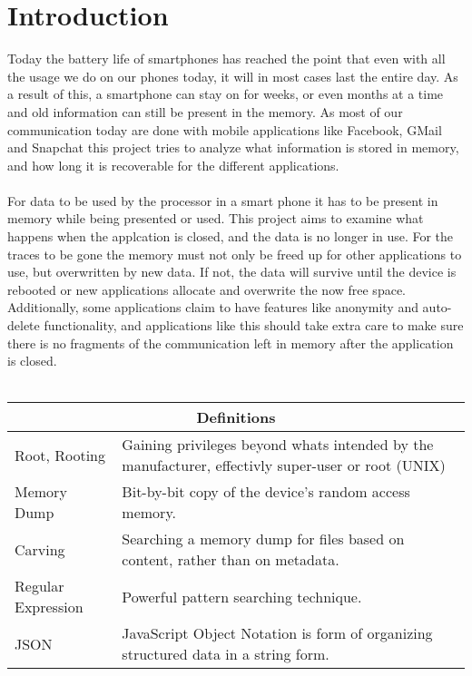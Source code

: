 \section{Introduction}
Today the battery life of smartphones has reached the point that even with all the usage we do on our phones today, it will in most cases last the entire day. As a result of this, a smartphone can stay on for weeks, or even months at a time and old information can still be present in the memory. As most of our communication today are done with mobile applications like Facebook, GMail and Snapchat this project tries to analyze what information is stored in memory, and how long it is recoverable for the different applications. \\ \\
For data to be used by the processor in a smart phone it has to be present in memory while being presented or used. This project aims to examine what happens when the applcation is closed, and the data is no longer in use. For the traces to be gone the memory must not only be freed up for other applications to use, but overwritten by new data. If not, the data will survive until the device is rebooted or new applications allocate and overwrite the now free space. Additionally, some applications claim to have features like anonymity and auto-delete functionality, and applications like this should take extra care to make sure there is no fragments of the communication left in memory after the application is closed.
\\ \\
\begin{tabular}{ |p{3cm}|p{4cm}|  }
 \hline
 \multicolumn{2}{|c|}{\textbf{Definitions}} \\
 \hline
 Root, Rooting&Gaining privileges beyond whats intended by the manufacturer, effectivly super-user or root (UNIX) \\
 \hline
  Memory Dump& Bit-by-bit copy of the device's random access memory.\\
 \hline
 Carving& Searching a memory dump for  files based on content, rather than on metadata.\\
 \hline
 Regular Expression & Powerful pattern searching technique.\\
 \hline
 JSON & JavaScript Object Notation is form of organizing structured data in a string form.\\
 \hline
\end{tabular}